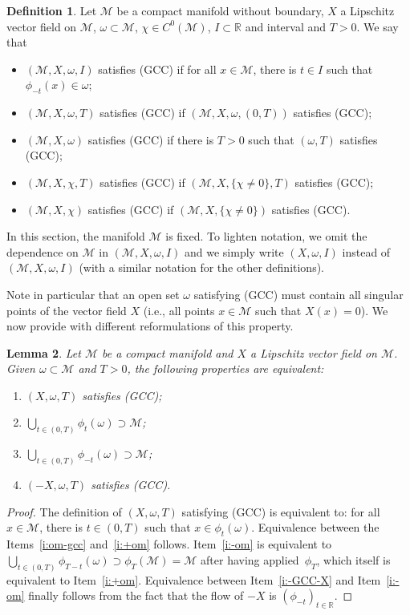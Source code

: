 \documentclass[11pt]{article}
\newcommand{\ie}{i.e.,\xspace}
\numberwithin{equation}{section}
\newcommand{\pGCC}{\textup{(GCC)}\xspace}
\newtheorem{lemma}{Lemma}[section]
\theoremstyle{definition}
\newtheorem{definition}[lemma]{Definition}
\newcommand{\M}{\ensuremath{\mathcal M}}
\newcommand{\mb}[1]{\ensuremath{\mathbb{#1}}}
\newcommand{\R}{{\mb{R}}}
\newcommand\bnp{\begin{proof}}
\newcommand\enp{\end{proof}}
\begin{document}
\begin{definition}
\label{d:def-GCC}
Let $\M$ be a compact manifold without boundary, $X$ a Lipschitz vector field on $\M$, $\omega \subset \M$, $\chi \in C^0(\M)$, $I\subset \R$ and interval and $T>0$. We say that
\begin{itemize}
\item $(\M,X, \omega,I)$ satisfies \pGCC if for all $x\in \M$, there is $t \in I$ such that $\phi_{-t}(x)\in \omega$;
\item $(\M,X, \omega,T)$ satisfies \pGCC if $(\M,X, \omega,(0,T))$ satisfies \pGCC;
\item $(\M,X, \omega)$ satisfies \pGCC if there is $T>0$ such that $(\omega,T)$ satisfies \pGCC;
\item $(\M,X, \chi,T)$ satisfies \pGCC if $(\M,X, \{\chi\neq 0\},T)$ satisfies \pGCC;
\item $(\M,X, \chi)$ satisfies \pGCC if $(\M,X, \{\chi\neq 0\})$ satisfies \pGCC.
\end{itemize}
\end{definition}
In this section, the manifold $\M$ is fixed. To lighten notation, we omit the dependence on $\M$ in $(\M,X, \omega,I)$ and we simply write $(X,\omega,I)$ instead of $(\M,X, \omega,I)$ (with a similar notation for the other definitions).

Note in particular that an open set $\omega$ satisfying \pGCC must contain all singular points of the vector field $X$ (\ie all points $x\in \M$ such that $X(x)=0$).
We now provide with different reformulations of this property.\enlargethispage{-\baselineskip}%
\begin{lemma}
\label{l:equiv-GCC}
Let $\M$ be a compact manifold and $X$ a Lipschitz vector field on $\M$.
Given $\omega \subset \M$ and $T>0$, the following properties are equivalent:
\begin{enumerate}
\item \label{i:om-gcc} $(X,\omega,T)$ satisfies \pGCC;
\item \label{i:+om} $\bigcup_{t\in (0,T)}\phi_t(\omega) \supset \M$;
\item \label{i:-om} $\bigcup_{t\in (0,T)}\phi_{-t}(\omega) \supset \M$;
\item \label{i:-GCC-X} $(-X,\omega,T)$ satisfies \pGCC.
\end{enumerate}
\end{lemma}
\bnp
The definition of $(X,\omega,T)$ satisfying \pGCC is equivalent to: for all \hbox{$x\in \M$}, there is $t \in (0,T)$ such that $x \in \phi_t(\omega)$.
Equivalence between the Items~\eqref{i:om-gcc} and~\eqref{i:+om} follows. Item~\eqref{i:-om} is equivalent to $\bigcup_{t\in (0,T)}\phi_{T-t}(\omega) \supset \phi_{T} (\M) = \M$ after having applied~$\phi_T$, which itself is equivalent to Item~\eqref{i:+om}. Equivalence between Item~\eqref{i:-GCC-X} and Item~\eqref{i:-om} finally follows from the fact that the flow of $-X$ is $(\phi_{-t})_{t\in \R}$.
\enp
\end{document}
